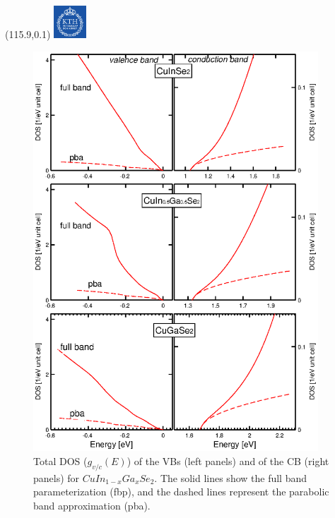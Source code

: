 \documentclass[]{beamer}
\newcommand{\MyLogo}{%
\begin{textblock}{14}(115.9,0.1)
  \includegraphics[width=1.22cm]{kth_rgb}
 \end{textblock}
}
\begin{document}
\begin{frame}
\MyLogo
\begin{figure}\label{dos}
  \begin{minipage}{0.5\textwidth} 
    \includegraphics[width=0.95\textwidth]{seminar/dos}
  \end{minipage}%
  \begin{minipage}{0.5\textwidth}
    \caption{  Total DOS ($ g_{v/c}(E)$) of the VBs (left panels) and of the CB (right panels) for $CuIn_{1-x}Ga_xSe_2$. The solid lines show the full band parameterization (fbp), and the dashed lines represent the parabolic band approximation (pba). }
  \end{minipage}
\end{figure}
\end{frame}
\end{document}
